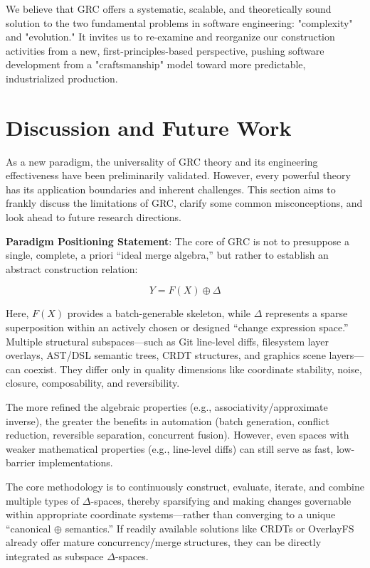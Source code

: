 \documentclass[11pt]{article}
\begin{document}
We believe that GRC offers a systematic, scalable, and theoretically sound solution to the two fundamental problems in software engineering: "complexity" and "evolution." It invites us to re-examine and reorganize our construction activities from a new, first-principles-based perspective, pushing software development from a "craftsmanship" model toward more predictable, industrialized production.

\section{Discussion and Future Work}

As a new paradigm, the universality of GRC theory and its engineering effectiveness have been preliminarily validated. However, every powerful theory has its application boundaries and inherent challenges. This section aims to frankly discuss the limitations of GRC, clarify some common misconceptions, and look ahead to future research directions.

\textbf{Paradigm Positioning Statement}: The core of GRC is not to presuppose a single, complete, a priori ``ideal merge algebra,'' but rather to establish an abstract construction relation:

\[
Y = F(X) \oplus \Delta
\]

Here, \( F(X) \) provides a batch-generable skeleton, while \( \Delta \) represents a sparse superposition within an actively chosen or designed ``change expression space.'' Multiple structural subspaces—such as Git line-level diffs, filesystem layer overlays, AST/DSL semantic trees, CRDT structures, and graphics scene layers—can coexist. They differ only in quality dimensions like coordinate stability, noise, closure, composability, and reversibility.

The more refined the algebraic properties (e.g., associativity/approximate inverse), the greater the benefits in automation (batch generation, conflict reduction, reversible separation, concurrent fusion). However, even spaces with weaker mathematical properties (e.g., line-level diffs) can still serve as fast, low-barrier implementations.

The core methodology is to continuously construct, evaluate, iterate, and combine multiple types of \( \Delta \)-spaces, thereby sparsifying and making changes governable within appropriate coordinate systems—rather than converging to a unique ``canonical \( \oplus \) semantics.'' If readily available solutions like CRDTs or OverlayFS already offer mature concurrency/merge structures, they can be directly integrated as subspace \( \Delta \)-spaces.
\end{document}
